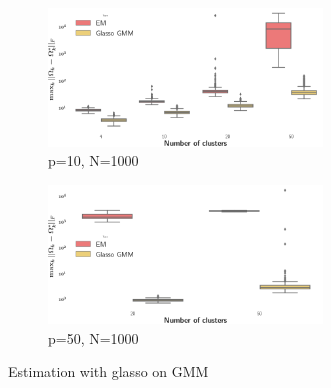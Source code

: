 \begin{figure}

        \begin{subfigure}[b]{\textwidth}
                \includegraphics[width=0.8\textwidth]{TeX_files/graph_lasso_10_1000.png} 
                \caption{p=10, N=1000}
                \label{fig:glasso_dim10_N1000}
        \end{subfigure}       
        \begin{subfigure}[b]{\textwidth}
                \includegraphics[width=0.8\textwidth]{TeX_files/graph_lasso_50_1000.png}
                \caption{p=50, N=1000}
                \label{fig:glasso_dim50_N1000}
        \end{subfigure}
        \caption{Estimation with glasso on GMM}\label{fig:glasso_res_simu2} 
\end{figure}

